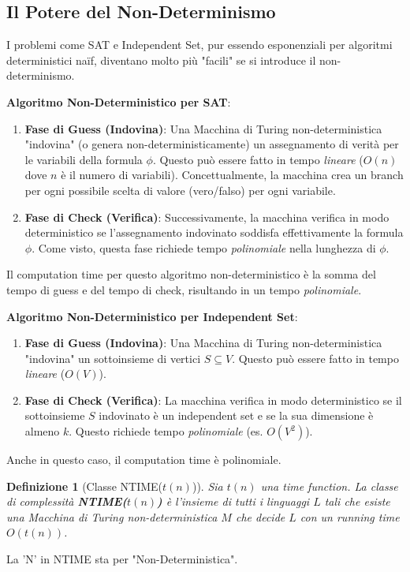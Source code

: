 \documentclass[a4paper]{article}
\newtheorem{definition}{Definizione}[section]
\begin{document}
\subsection{Il Potere del Non-Determinismo}
I problemi come SAT e Independent Set, pur essendo esponenziali per algoritmi deterministici naïf, diventano molto più "facili" se si introduce il non-determinismo.

\textbf{Algoritmo Non-Deterministico per SAT}:
\begin{enumerate}
    \item \textbf{Fase di Guess (Indovina)}: Una Macchina di Turing non-deterministica "indovina" (o genera non-deterministicamente) un assegnamento di verità per le variabili della formula $\phi$. Questo può essere fatto in tempo \emph{lineare} ($O(n)$ dove $n$ è il numero di variabili). Concettualmente, la macchina crea un branch per ogni possibile scelta di valore (vero/falso) per ogni variabile.
    \item \textbf{Fase di Check (Verifica)}: Successivamente, la macchina verifica in modo deterministico se l'assegnamento indovinato soddisfa effettivamente la formula $\phi$. Come visto, questa fase richiede tempo \emph{polinomiale} nella lunghezza di $\phi$.
\end{enumerate}
Il computation time per questo algoritmo non-deterministico è la somma del tempo di guess e del tempo di check, risultando in un tempo \emph{polinomiale}.

\textbf{Algoritmo Non-Deterministico per Independent Set}:
\begin{enumerate}
    \item \textbf{Fase di Guess (Indovina)}: Una Macchina di Turing non-deterministica "indovina" un sottoinsieme di vertici $S \subseteq V$. Questo può essere fatto in tempo \emph{lineare} ($O(V)$).
    \item \textbf{Fase di Check (Verifica)}: La macchina verifica in modo deterministico se il sottoinsieme $S$ indovinato è un independent set e se la sua dimensione è almeno $k$. Questo richiede tempo \emph{polinomiale} (es. $O(V^2)$).
\end{enumerate}
Anche in questo caso, il computation time è polinomiale.

\begin{definition}[Classe NTIME($t(n)$)]
Sia $t(n)$ una time function. La classe di complessità \textbf{NTIME($t(n)$)} è l'insieme di tutti i linguaggi $L$ tali che esiste una Macchina di Turing \emph{non-deterministica} $M$ che decide $L$ con un running time $O(t(n))$.
\end{definition}
La 'N' in NTIME sta per "Non-Deterministica".
\end{document}
